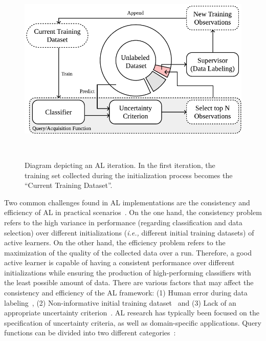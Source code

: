 \begin{figure}[ht]
	\centering
	\includegraphics[width=.6\linewidth]{al_iteration}
    \caption[Diagram depicting an AL iteration.]{%
        Diagram depicting an AL iteration. In the first iteration, the
        training set collected during the initialization process becomes the
        ``Current Training Dataset''.
    }~\label{fig:al_iteration_int}
\end{figure}

Two common challenges found in AL implementations are the consistency and
efficiency of AL in practical scenarios~\cite{Kottke2017}. On the one hand,
the consistency problem refers to the high variance in performance (regarding
classification and data selection) over different initializations
(\textit{i.e.,} different initial training datasets) of active learners. On
the other hand, the efficiency problem refers to the maximization of the
quality of the collected data over a run. Therefore, a good active learner is
capable of having a consistent performance over different initializations
while ensuring the production of high-performing classifiers with the least
possible amount of data. There are various factors that may affect the
consistency and efficiency of the AL framework: (1) Human error during data
labeling~\cite{li2020}, (2) Non-informative initial training
dataset~\cite{Nguyen2004} and (3) Lack of an appropriate uncertainty
criterion~\cite{Rosario2020}. AL research has typically been focused on the
specification of uncertainty criteria, as well as domain-specific
applications. Query functions can be divided into two different
categories~\cite{Gu2021, Kumar2020}: 

